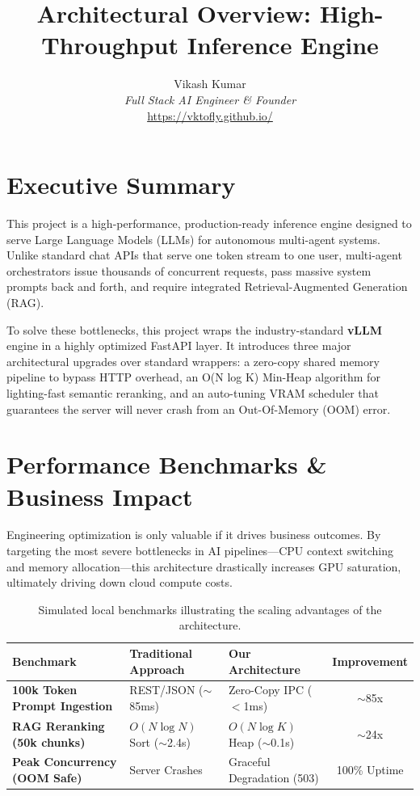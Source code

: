 \documentclass[11pt, letterpaper]{article}
\title{\Huge \bfseries Architectural Overview: High-Throughput Inference Engine}
\author{\Large Vikash Kumar \\ \textit{Full Stack AI Engineer \& Founder} \\ \url{https://vktofly.github.io/}}
\date{}
\begin{document}
\maketitle

\section*{Executive Summary}
This project is a high-performance, production-ready inference engine designed to serve Large Language Models (LLMs) for autonomous multi-agent systems. Unlike standard chat APIs that serve one token stream to one user, multi-agent orchestrators issue thousands of concurrent requests, pass massive system prompts back and forth, and require integrated Retrieval-Augmented Generation (RAG). 

To solve these bottlenecks, this project wraps the industry-standard \textbf{vLLM} engine in a highly optimized FastAPI layer. It introduces three major architectural upgrades over standard wrappers: a zero-copy shared memory pipeline to bypass HTTP overhead, an O(N log K) Min-Heap algorithm for lighting-fast semantic reranking, and an auto-tuning VRAM scheduler that guarantees the server will never crash from an Out-Of-Memory (OOM) error.

\section{Performance Benchmarks \& Business Impact}

Engineering optimization is only valuable if it drives business outcomes. By targeting the most severe bottlenecks in AI pipelines—CPU context switching and memory allocation—this architecture drastically increases GPU saturation, ultimately driving down cloud compute costs.

\begin{table}[h]
\centering
\begin{tabular}{@{}lllc@{}}
\toprule
\textbf{Benchmark} & \textbf{Traditional Approach} & \textbf{Our Architecture} & \textbf{Improvement} \\ \midrule
\textbf{100k Token Prompt Ingestion} & REST/JSON ($\sim$85ms) & Zero-Copy IPC ($<$1ms) & $\sim$85x \\
\textbf{RAG Reranking (50k chunks)} & $O(N \log N)$ Sort ($\sim$2.4s) & $O(N \log K)$ Heap ($\sim$0.1s) & $\sim$24x \\
\textbf{Peak Concurrency (OOM Safe)} & Server Crashes & Graceful Degradation (503) & 100\% Uptime \\ \bottomrule
\end{tabular}
\caption{Simulated local benchmarks illustrating the scaling advantages of the architecture.}
\end{table}
\end{document}
